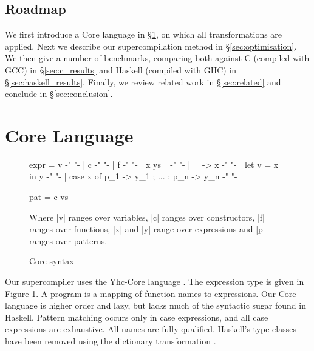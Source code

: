 \subsection{Roadmap}

We first introduce a Core language in \S\ref{sec:core}, on which all transformations are applied. Next we describe our supercompilation method in \S\ref{sec:optimisation}. We then give a number of benchmarks, comparing both against C (compiled with GCC) in \S\ref{sec:c_results} and Haskell (compiled with GHC) in \S\ref{sec:haskell_results}. Finally, we review related work in \S\ref{sec:related} and conclude in \S\ref{sec:conclusion}.

\section{Core Language}
\label{sec:core}

\begin{figure}
\begin{code}
expr  =  v                                          {-"  "-}
      |  c                                          {-"  "-}
      |  f                                          {-"  "-}
      |  x ys_                                      {-"  "-}
      |  \vs_ -> x                                  {-"  "-}
      |  let v = x in y                             {-"  "-}
      |  case x of {p_1 -> y_1 ; ... ; p_n -> y_n}  {-"  "-}

pat   =  c vs_
\end{code}

Where |v| ranges over variables, |c| ranges over constructors, |f| ranges over functions, |x| and |y| range over expressions and |p| ranges over patterns.
\caption{Core syntax}
\label{fig:core}
\end{figure}

Our supercompiler uses the Yhc-Core language \cite{me:yhc_core}. The expression type is given in Figure \ref{fig:core}. A program is a mapping of function names to expressions. Our Core language is higher order and lazy, but lacks much of the syntactic sugar found in Haskell. Pattern matching occurs only in case expressions, and all case expressions are exhaustive. All names are fully qualified. Haskell's type classes have been removed using the dictionary transformation \cite{wadler:type_classes}.

